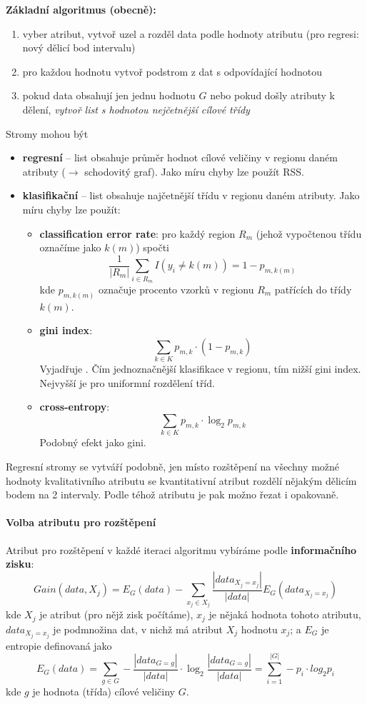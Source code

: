 \documentclass[11pt]{report} %
\numberwithin{equation}{section}
\begin{document}
\textbf{Základní algoritmus (obecně):}
\begin{enumerate}
	\item vyber atribut, vytvoř uzel a rozděl data podle hodnoty atributu (pro regresi: nový dělicí bod intervalu)
	\item pro každou hodnotu vytvoř podstrom z dat s odpovídající hodnotou
	\item pokud data obsahují jen jednu hodnotu $G$ nebo pokud došly atributy k dělení, \textit{vytvoř list s hodnotou nejčetnější cílové třídy}
\end{enumerate}

Stromy mohou být
\begin{itemize}
	\item \textbf{regresní} -- list obsahuje průměr hodnot cílové veličiny v regionu daném atributy ($\to$ schodovitý graf). Jako míru chyby lze použít RSS.
	
	\item \textbf{klasifikační} -- list obsahuje najčetnější třídu v regionu daném atributy. Jako míru chyby lze použít:
	\begin{itemize}
		\item \textbf{classification error rate}: pro každý region $R_m$ (jehož vypočtenou třídu označíme jako $k(m)$) spočti
		$$\frac{1}{|R_m|} \sum_{i \in R_m} I(y_i \neq k(m)) = 1 - p_{m,k(m)}$$
		kde $p_{m,k(m)}$ označuje procento vzorků v regionu $R_m$ patřících do třídy $k(m)$.
		
		\item \textbf{gini index}: 
		$$\sum_{k \in K} p_{m,k} \cdot (1 - p_{m,k})$$
		Vyjadřuje . Čím jednoznačnější klasifikace v regionu, tím nižší gini index. Nejvyšší je pro uniformní rozdělení tříd.
		
		\item \textbf{cross-entropy}: 
		$$\sum_{k \in K} p_{m,k}\cdot \log_2 p_{m,k}$$
		Podobný efekt jako gini.
	\end{itemize}
\end{itemize}

Regresní stromy se vytváří podobně, jen místo rozštěpení na všechny možné hodnoty kvalitativního atributu se kvantitativní atribut rozdělí nějakým dělicím bodem na 2 intervaly. Podle téhož atributu je pak možno řezat i opakovaně. 

\paragraph{Volba atributu pro rozštěpení}
Atribut pro rozštěpení v každé iteraci algoritmu vybíráme podle \textbf{informačního zisku}:
$$Gain(data, X_j) = E_G(data) - \sum_{x_j \in X_j} \frac{|data_{X_j = x_j}|}{|data|}E_G(data_{X_j = x_j}) $$
kde $X_j$ je atribut (pro nějž zisk počítáme), $x_j$ je nějaká hodnota tohoto atributu, $data_{X_j = x_j}$ je podmnožina dat, v nichž má atribut $X_j$ hodnotu $x_j$; a $E_G$ je entropie definovaná jako
$$E_G(data) = \sum_{g \in G} - \frac{|data_{G=g}|}{|data|}\cdot \log_2 \frac{|data_{G=g}|}{|data|} = \sum_{i=1}^{|G|} - p_i\cdot log_2p_i$$
kde $g$ je hodnota (třída) cílové veličiny $G$.
\end{document}
